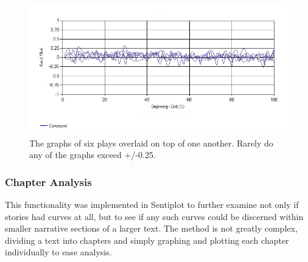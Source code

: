 \documentclass{article}
\begin{document}
{            \begin{figure}
                \includegraphics[width=1\textwidth]{Figures/Curve/ShakespeareOverlaid}
                \centering
                \caption{The graphs of six plays overlaid on top of one another. Rarely do any of the graphs exceed +/-0.25.} 
                \label{fig:ShakespeareOverlaid}
            \end{figure}
        \subsubsection{Chapter Analysis}
            This functionality was implemented in Sentiplot to further examine not only if stories had curves at all, but to see if any such curves could be discerned within smaller narrative sections of a larger text. The method is not greatly complex, dividing a text into chapters and simply graphing and plotting each chapter individually to ease analysis.

}
\end{document}
